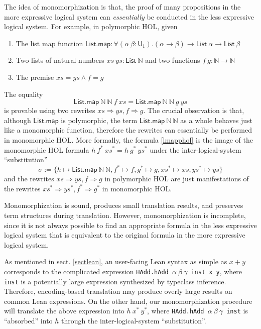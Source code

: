   The idea of monomorphization is that, the proof of many propositions in the more expressive logical
  system can \textit{essentially} be conducted in the less expressive logical system. For example,
  in polymorphic HOL, given
  \begin{enumerate}
    \item The list map function $\mathsf{List.map} : \forall (\alpha \ \beta : \mathsf{U}_1). (\alpha \to \beta) \to \mathsf{List} \ \alpha \to \mathsf{List} \ \beta$
    \item Two lists of natural numbers $xs \ ys : \mathsf{List} \ \mathbb{N}$ and two functions $f \ g : \mathbb{N} \to \mathbb{N}$
    \item The premise $xs = ys \land f = g$
  \end{enumerate}
  The equality
  \begin{equation}\label{lmapphol}
    \mathsf{List.map} \ \mathbb{N} \ \mathbb{N} \ f \ xs = \mathsf{List.map} \ \mathbb{N} \ \mathbb{N} \ g \ ys
  \end{equation}
  is provable using two rewrites $xs \Rightarrow ys, f \Rightarrow g$. The crucial observation is that, although $\textsf{List.map}$ is polymorphic, the term
  $\mathsf{List.map} \ \mathbb{N} \ \mathbb{N}$ as a whole behaves just like a monomorphic function,
  therefore the rewrites can essentially be performed in monomorphic HOL. More formally,
  the formula \eqref{lmapphol} is the image of the monomorphic HOL formula $h \ f^* \ xs^* = h \ g^* \ ys^*$
  under the inter-logical-system ``substitution''
  $$\sigma := \{h \mapsto \mathsf{List.map} \ \mathbb{N} \ \mathbb{N},
    f^* \mapsto f, g^* \mapsto g, xs^* \mapsto xs, ys^* \mapsto ys\}$$
  and the rewrites $xs \Rightarrow ys, f \Rightarrow g$ in polymorphic HOL are just manifestations of the
  rewrites $xs^* \Rightarrow ys^*, f^* \Rightarrow g^*$ in monomorphic HOL.
  
  Monomorphization is sound, produces small translation results, and preserves
  term structures during translation. However, monomorphization is incomplete,
  since it is not always possible to find an appropriate formula in the less
  expressive logical system that is equivalent to the original formula
  in the more expressive logical system.


  As mentioned in sect. \ref{sectlean}, an user-facing Lean syntax as simple as $x + y$ corresponds to
  the complicated expression \texttt{HAdd.hAdd $\alpha \ \beta \ \gamma$ inst x y}, where \texttt{inst}
  is a potentially large expression synthesized by typeclass inference. Therefore,
  encoding-based translation may produce overly large results on common Lean expressions.
  On the other hand, our monomorphization procedure will translate the above expression
  into $h \ x^* \ y^*$, where \texttt{HAdd.hAdd $\alpha \ \beta \ \gamma$ inst}
  is ``absorbed'' into $h$ through the inter-logical-system ``substitution''.